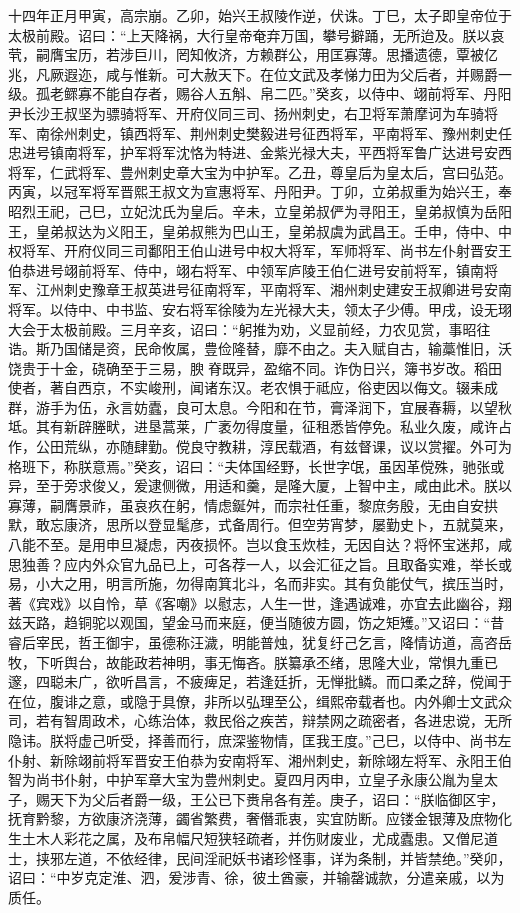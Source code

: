 \documentclass[]{article}
\begin{document}
十四年正月甲寅，高宗崩。乙卯，始兴王叔陵作逆，伏诛。丁巳，太子即皇帝位于太极前殿。诏曰：``上天降祸，大行皇帝奄弃万国，攀号擗踊，无所迨及。朕以哀茕，嗣膺宝历，若涉巨川，罔知攸济，方赖群公，用匡寡薄。思播遗德，覃被亿兆，凡厥遐迩，咸与惟新。可大赦天下。在位文武及孝悌力田为父后者，并赐爵一级。孤老鳏寡不能自存者，赐谷人五斛、帛二匹。''癸亥，以侍中、翊前将军、丹阳尹长沙王叔坚为骠骑将军、开府仪同三司、扬州刺史，右卫将军萧摩诃为车骑将军、南徐州刺史，镇西将军、荆州刺史樊毅进号征西将军，平南将军、豫州刺史任忠进号镇南将军，护军将军沈恪为特进、金紫光禄大夫，平西将军鲁广达进号安西将军，仁武将军、豊州刺史章大宝为中护军。乙丑，尊皇后为皇太后，宫曰弘范。丙寅，以冠军将军晋熙王叔文为宣惠将军、丹阳尹。丁卯，立弟叔重为始兴王，奉昭烈王祀，己巳，立妃沈氏为皇后。辛未，立皇弟叔俨为寻阳王，皇弟叔慎为岳阳王，皇弟叔达为义阳王，皇弟叔熊为巴山王，皇弟叔虞为武昌王。壬申，侍中、中权将军、开府仪同三司鄱阳王伯山进号中权大将军，军师将军、尚书左仆射晋安王伯恭进号翊前将军、侍中，翊右将军、中领军庐陵王伯仁进号安前将军，镇南将军、江州刺史豫章王叔英进号征南将军，平南将军、湘州刺史建安王叔卿进号安南将军。以侍中、中书监、安右将军徐陵为左光禄大夫，领太子少傅。甲戌，设无珝大会于太极前殿。三月辛亥，诏曰：``躬推为劝，义显前经，力农见赏，事昭往诰。斯乃国储是资，民命攸属，豊俭隆替，靡不由之。夫入赋自古，输藁惟旧，沃饶贵于十金，硗确至于三易，腴脊既异，盈缩不同。诈伪日兴，簿书岁改。稻田使者，著自西京，不实峻刑，闻诸东汉。老农惧于祗应，俗吏因以侮文。辍耒成群，游手为伍，永言妨蠹，良可太息。今阳和在节，膏泽润下，宜展春耨，以望秋坻。其有新辟塍畎，进垦蒿莱，广袤勿得度量，征租悉皆停免。私业久废，咸许占作，公田荒纵，亦随肆勤。傥良守教耕，淳民载酒，有兹督课，议以赏擢。外可为格班下，称朕意焉。''癸亥，诏曰：``夫体国经野，长世字氓，虽因革傥殊，驰张或异，至于旁求俊乂，爰逮侧微，用适和羹，是隆大厦，上智中主，咸由此术。朕以寡薄，嗣膺景祚，虽哀疚在躬，情虑鋋舛，而宗社任重，黎庶务殷，无由自安拱默，敢忘康济，思所以登显髦彦，式备周行。但空劳宵梦，屡勤史卜，五就莫来，八能不至。是用申旦凝虑，丙夜损怀。岂以食玉炊桂，无因自达？将怀宝迷邦，咸思独善？应内外众官九品已上，可各荐一人，以会汇征之旨。且取备实难，举长或易，小大之用，明言所施，勿得南箕北斗，名而非实。其有负能仗气，摈压当时，著《宾戏》以自怜，草《客嘲》以慰志，人生一世，逢遇诚难，亦宜去此幽谷，翔兹天路，趋铜驼以观国，望金马而来庭，便当随彼方圆，饬之矩矱。''又诏曰：``昔睿后宰民，哲王御宇，虽德称汪濊，明能普烛，犹复纡己乞言，降情访道，高咨岳牧，下听舆台，故能政若神明，事无悔吝。朕纂承丕绪，思隆大业，常惧九重已邃，四聪未广，欲听昌言，不疲痺足，若逢廷折，无惮批鳞。而口柔之辞，傥闻于在位，腹诽之意，或隐于具僚，非所以弘理至公，缉熙帝载者也。内外卿士文武众司，若有智周政术，心练治体，救民俗之疾苦，辩禁网之疏密者，各进忠谠，无所隐讳。朕将虚己听受，择善而行，庶深鉴物情，匡我王度。''己巳，以侍中、尚书左仆射、新除翊前将军晋安王伯恭为安南将军、湘州刺史，新除翊左将军、永阳王伯智为尚书仆射，中护军章大宝为豊州刺史。夏四月丙申，立皇子永康公胤为皇太子，赐天下为父后者爵一级，王公已下赉帛各有差。庚子，诏曰：``朕临御区宇，抚育黔黎，方欲康济浇薄，蠲省繁费，奢僭乖衷，实宜防断。应镂金银薄及庶物化生土木人彩花之属，及布帛幅尺短狭轻疏者，并伤财废业，尤成蠹患。又僧尼道士，挟邪左道，不依经律，民间淫祀妖书诸珍怪事，详为条制，并皆禁绝。''癸卯，诏曰：``中岁克定淮、泗，爰涉青、徐，彼土酋豪，并输罄诚款，分遣亲戚，以为质任。
\end{document}
